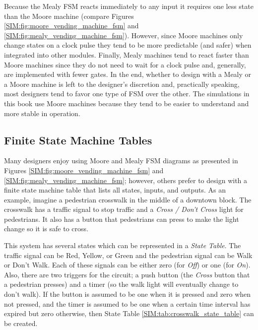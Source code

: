 Because the Mealy \ac{FSM} reacts immediately to any input it requires one less state than the Moore machine (compare Figures \ref{SIM:fig:moore_vending_machine_fsm} and \ref{SIM:fig:mealy_vending_machine_fsm}). However, since Moore machines only change states on a clock pulse they tend to be more predictable (and safer) when integrated into other modules. Finally, Mealy machines tend to react faster than Moore machines since they do not need to wait for a clock pulse and, generally, are implemented with fewer gates. In the end, whether to design with a Mealy or a Moore machine is left to the designer's discretion and, practically speaking, most designers tend to favor one type of \ac{FSM} over the other. The simulations in this book use Moore machines because they tend to be easier to understand and more stable in operation.

\subsection{Finite State Machine Tables}
\label{SIM:subsec:finite_state_machine_tables}

Many designers enjoy using Moore and Mealy \ac{FSM} diagrams as presented in Figures \ref{SIM:fig:moore_vending_machine_fsm} and \ref{SIM:fig:mealy_vending_machine_fsm}; however, others prefer to design with a finite state machine table that lists all states, inputs, and outputs. As an example, imagine a pedestrian crosswalk in the middle of a downtown block. The crosswalk has a traffic signal to stop traffic and a \emph{Cross / Don't Cross} light for pedestrians. It also has a button that pedestrians can press to make the light change so it is safe to cross.

This system has several states which can be represented in a \emph{State Table}. The traffic signal can be Red, Yellow, or Green and the pedestrian signal can be Walk or Don't Walk. Each of these signals can be either zero (for \emph{Off}) or one (for \emph{On}). Also, there are two triggers for the circuit; a push button (the \emph{Cross} button that a pedestrian presses) and a timer (so the walk light will eventually change to don't walk). If the button is assumed to be one when it is pressed and zero when not pressed, and the timer is assumed to be one when a certain time interval has expired but zero otherwise, then State Table \ref{SIM:tab:crosswalk_state_table} can be created.

